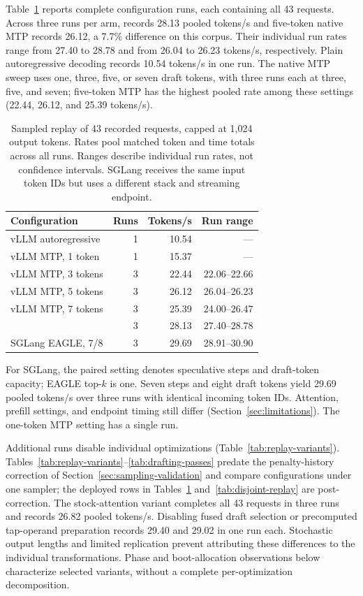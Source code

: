 Table~\ref{tab:request-replay} reports complete configuration runs, each containing all 43 requests. Across three runs per arm, \sys{} records 28.13 pooled tokens/s and five-token native MTP records 26.12, a 7.7\% difference on this corpus. Their individual run rates range from 27.40 to 28.78 and from 26.04 to 26.23 tokens/s, respectively. Plain autoregressive decoding records 10.54 tokens/s in one run. The native MTP sweep uses one, three, five, or seven draft tokens, with three runs each at three, five, and seven; five-token MTP has the highest pooled rate among these settings (22.44, 26.12, and 25.39 tokens/s).

\begin{table}[t]
\caption{Sampled replay of 43 recorded requests, capped at 1,024 output tokens. Rates pool matched token and time totals across all runs. Ranges describe individual run rates, not confidence intervals. SGLang receives the same input token IDs but uses a different stack and streaming endpoint.}
\label{tab:request-replay}
\centering\small
\begin{tabular}{@{}lrrr@{}}
\toprule
Configuration & Runs & Tokens/s & Run range \\
\midrule
vLLM autoregressive & 1 & 10.54 & --- \\
vLLM MTP, 1 token & 1 & 15.37 & --- \\
vLLM MTP, 3 tokens & 3 & 22.44 & 22.06--22.66 \\
vLLM MTP, 5 tokens & 3 & 26.12 & 26.04--26.23 \\
vLLM MTP, 7 tokens & 3 & 25.39 & 24.00--26.47 \\
\sys{} & 3 & 28.13 & 27.40--28.78 \\
\midrule
SGLang EAGLE, 7/8 & 3 & 29.69 & 28.91--30.90 \\
\bottomrule
\end{tabular}
\end{table}

For SGLang, the paired setting denotes speculative steps and draft-token capacity; EAGLE top-$k$ is one. Seven steps and eight draft tokens yield 29.69 pooled tokens/s over three runs with identical incoming token IDs. Attention, prefill settings, and endpoint timing still differ (Section~\ref{sec:limitations}). The one-token MTP setting has a single run.

Additional runs disable individual \sys{} optimizations (Table~\ref{tab:replay-variants}). Tables~\ref{tab:replay-variants}--\ref{tab:drafting-passes} predate the penalty-history correction of Section~\ref{sec:sampling-validation} and compare configurations under one sampler; the deployed rows in Tables~\ref{tab:request-replay} and~\ref{tab:disjoint-replay} are post-correction. The stock-attention variant completes all 43 requests in three runs and records 26.82 pooled tokens/s. Disabling fused draft selection or precomputed tap-operand preparation records 29.40 and 29.02 in one run each. Stochastic output lengths and limited replication prevent attributing these differences to the individual transformations. Phase and boot-allocation observations below characterize selected variants, without a complete per-optimization decomposition.

